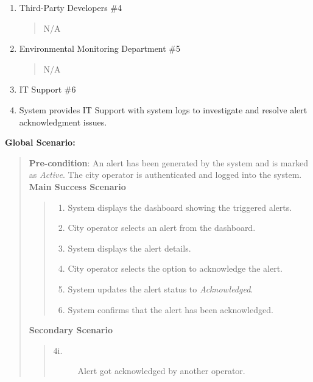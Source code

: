 \documentclass[]{article}
\begin{document}
\begin{enumerate}[{\bf BE5.}]
\begin{enumerate}[{\bf VP1.}]
			\item Third-Party Developers \#4
				\begin{quote}
				    N/A
				\end{quote}
                
			\item Environmental Monitoring Department \#5
				\begin{quote}
				    N/A
				\end{quote}

			\item IT Support \#6
                \item[\textmd{5i}] System provides IT Support with system logs to investigate and resolve alert acknowledgment issues.
		\end{enumerate}
        
        {\bf Global Scenario:}
        	\begin{quote}
        	    \textbf{Pre-condition}: An alert has been generated by the system and is marked as \textit{Active}. The city operator is authenticated and logged into the system. \\
                \textbf{Main Success Scenario} 
                    \begin{quote}
                    \begin{enumerate}[1.]
                        \item System displays the dashboard showing the triggered alerts.
                        \item City operator selects an alert from the dashboard.
                        \item System displays the alert details.
                        \item City operator selects the option to acknowledge the alert.
                        \item System updates the alert status to \textit{Acknowledged}.
                        \item System confirms that the alert has been acknowledged. 
                    \end{enumerate}
                    \end{quote}
                \textbf{Secondary Scenario} 
                \begin{quote}
                    \begin{description}
                        \item[\textmd{4i.}] Alert got acknowledged by another operator.
                        \begin{description}

\end{description}
\end{description}
\end{quote}
\end{quote}
\end{enumerate}
\end{document}
